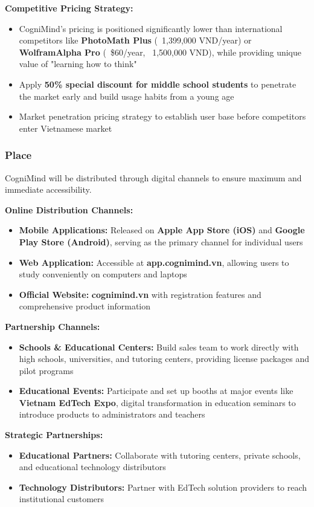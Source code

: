 \textbf{Competitive Pricing Strategy:}
\begin{itemize}
    \item CogniMind's pricing is positioned significantly lower than international competitors like \textbf{PhotoMath Plus} (~1,399,000 VND/year) or \textbf{WolframAlpha Pro} (~\$60/year, ~1,500,000 VND), while providing unique value of "learning how to think"
    \item Apply \textbf{50\% special discount for middle school students} to penetrate the market early and build usage habits from a young age
    \item Market penetration pricing strategy to establish user base before competitors enter Vietnamese market
\end{itemize}

\subsubsection{Place}
CogniMind will be distributed through digital channels to ensure maximum and immediate accessibility.

\textbf{Online Distribution Channels:}
\begin{itemize}
    \item \textbf{Mobile Applications:} Released on \textbf{Apple App Store (iOS)} and \textbf{Google Play Store (Android)}, serving as the primary channel for individual users
    \item \textbf{Web Application:} Accessible at \textbf{app.cognimind.vn}, allowing users to study conveniently on computers and laptops
    \item \textbf{Official Website:} \textbf{cognimind.vn} with registration features and comprehensive product information
\end{itemize}

\textbf{Partnership Channels:}
\begin{itemize}
    \item \textbf{Schools \& Educational Centers:} Build sales team to work directly with high schools, universities, and tutoring centers, providing license packages and pilot programs
    \item \textbf{Educational Events:} Participate and set up booths at major events like \textbf{Vietnam EdTech Expo}, digital transformation in education seminars to introduce products to administrators and teachers
\end{itemize}

\textbf{Strategic Partnerships:}
\begin{itemize}
    \item \textbf{Educational Partners:} Collaborate with tutoring centers, private schools, and educational technology distributors
    \item \textbf{Technology Distributors:} Partner with EdTech solution providers to reach institutional customers
\end{itemize}

